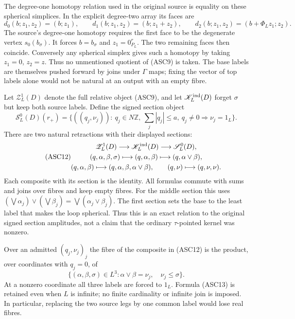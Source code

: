 The degree-one homotopy relation used in the original source is
equality on these spherical simplices. In the explicit degree-two
array its faces are
\begin{equation}\tag{ASC10}
d_0(b;z_1,z_2)=(b;z_1),\qquad
d_1(b;z_1,z_2)=(b;z_1+z_2),\qquad
d_2(b;z_1,z_2)=(b+\Phi_Lz_1;z_2).
\end{equation}
The source's degree-one homotopy requires the first face to be
the degenerate vertex $s_0(b_\sigma)$. It forces $b=b_\sigma$
and $z_1=0_{P_L}^r$. The two remaining faces then coincide.
Conversely any spherical simplex gives such a homotopy by taking
$z_1=0$, $z_2=z$. Thus no unmentioned quotient of (ASC9) is taken.
The base labels are themselves pushed forward by joins under
$\Gamma$ maps; fixing the vector of top labels alone would not
be natural at an output with an empty fibre.

Let $\mathscr Z_L^1(D)$ denote the full relative object (ASC9),
and let $\mathscr K_L^{\rm ind}(D)$ forget $\sigma$ but keep
both source labels. Define the signed section object
\begin{equation}\tag{ASC11}
\mathscr S_L^0(D)(r_+)=
\{((q_j,\nu_j)):\ q_j\in N\mathbb Z,\
  \sum_j|q_j|\le a,\ q_j\ne0\Rightarrow\nu_j=1_L\}.
\end{equation}
There are two natural retractions with their displayed sections:
\begin{equation}\tag{ASC12}
\begin{gathered}
\mathscr Z_L^1(D)\longrightarrow\mathscr K_L^{\rm ind}(D)
       \longrightarrow\mathscr S_L^0(D),\\
(q,\alpha,\beta,\sigma)\longmapsto(q,\alpha,\beta)
       \longmapsto(q,\alpha\vee\beta),\\
(q,\alpha,\beta)\longmapsto
       (q,\alpha,\beta,\alpha\vee\beta),\qquad
(q,\nu)\longmapsto(q,\nu,\nu).
\end{gathered}
\end{equation}
Each composite with its section is the identity. All formulas
commute with sums and joins over fibres and keep empty fibres.
For the middle section this uses
$(\bigvee\alpha_j)\vee(\bigvee\beta_j)
=\bigvee(\alpha_j\vee\beta_j)$. The first section sets the
base to the least label that makes the loop spherical. Thus this
is an exact relation to the original signed section amplitudes,
not a claim that the ordinary $\tau$-pointed kernel was nonzero.

Over an admitted $(q_j,\nu_j)_j$ the fibre of the composite in
(ASC12) is the product, over coordinates with $q_j=0$, of
\begin{equation}\tag{ASC13}
\{(\alpha,\beta,\sigma)\in L^3:
       \alpha\vee\beta=\nu_j,\quad\nu_j\le\sigma\}.
\end{equation}
At a nonzero coordinate all three labels are forced to $1_L$.
Formula (ASC13) is retained even when $L$ is infinite; no finite
cardinality or infinite join is imposed. In particular, replacing
the two source legs by one common label would lose real fibres.

